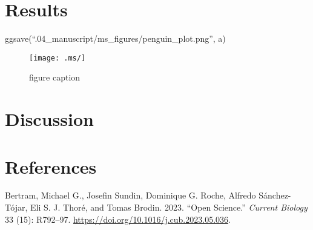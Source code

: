\documentclass[
]{article}
\newlength{\cslhangindent}
\newlength{\cslentryspacingunit} %
\newenvironment{CSLReferences}[2] %
 {%
  \setlength{\parindent}{0pt}
  \ifodd #1
  \let\oldpar\par
  \def\par{\hangindent=\cslhangindent\oldpar}
  \fi
  \setlength{\parskip}{#2\cslentryspacingunit}
 }%
 {}
\begin{document}
\hypertarget{results}{%
\section{Results}\label{results}}

ggsave(``.04\_manuscript/ms\_figures/penguin\_plot.png'', a)

\begin{figure}
\centering
\texttt{[image: .ms/]}
\caption{figure caption}
\end{figure}

\hypertarget{discussion}{%
\section{Discussion}\label{discussion}}

\hypertarget{references}{%
\section*{References}\label{references}}

\hypertarget{refs}{}
\begin{CSLReferences}{1}{0}
\leavevmode{}%
Bertram, Michael G., Josefin Sundin, Dominique G. Roche, Alfredo
Sánchez-Tójar, Eli S. J. Thoré, and Tomas Brodin. 2023. {``Open
Science.''} \emph{Current Biology} 33 (15): R792--97.
\url{https://doi.org/10.1016/j.cub.2023.05.036}.

\end{CSLReferences}
\end{document}

